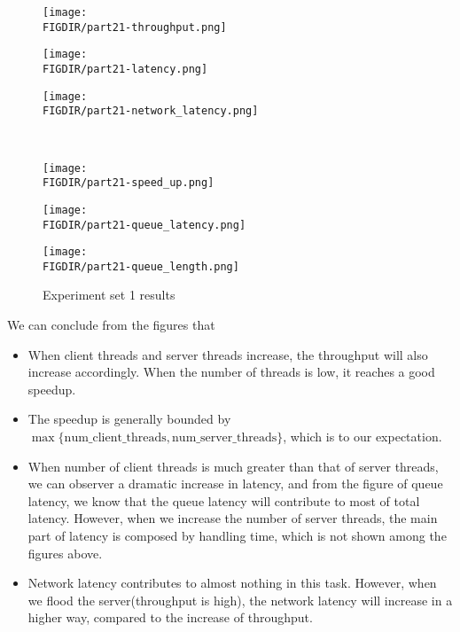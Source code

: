\documentclass{article}
\begin{document}
\begin{spacing}{1.1}
\begin{figure}[htbp]
	\centering
	\begin{minipage}{0.32\linewidth}
		\centering
		\texttt{[image: \\FIGDIR/part21-throughput.png]}
		\label{throuput1}
	\end{minipage}
	\begin{minipage}{0.32\linewidth}
		\centering
		\texttt{[image: \\FIGDIR/part21-latency.png]}
		\label{latency1}
	\end{minipage}
    \begin{minipage}{0.32\linewidth}
		\centering
		\texttt{[image: \\FIGDIR/part21-network\_latency.png]}
		\label{network-latency1}
	\end{minipage} \\
    \begin{minipage}{0.32\linewidth}
		\centering
		\texttt{[image: \\FIGDIR/part21-speed\_up.png]}
		\label{speed-up}
	\end{minipage}
    \begin{minipage}{0.32\linewidth}
		\centering
		\texttt{[image: \\FIGDIR/part21-queue\_latency.png]}
		\label{queue-latency1}
	\end{minipage}
	\begin{minipage}{0.32\linewidth}
		\centering
		\texttt{[image: \\FIGDIR/part21-queue\_length.png]}
		\label{queue-length1}
	\end{minipage}
    \caption{Experiment set 1 results}
\end{figure}

We can conclude from the figures that
\begin{itemize}
    \item When client threads and server threads increase, the throughput will also increase accordingly. When the number of threads is low, it reaches a good speedup. 
    \item The speedup is generally bounded by $\max\{\text{num\_client\_threads}, \text{num\_server\_threads}\}$, which is to our expectation.
    \item When number of client threads is much greater than that of server threads, we can observer a dramatic increase in latency, and from the figure of queue latency, we know that the queue latency will contribute to most of total latency. However, when we increase the number of server threads, the main part of latency is composed by handling time, which is not shown among the figures above.
    \item Network latency contributes to almost nothing in this task. However, when we flood the server(throughput is high), the network latency will increase in a higher way, compared to the increase of throughput.
\end{itemize}


\end{spacing}
\end{document}
